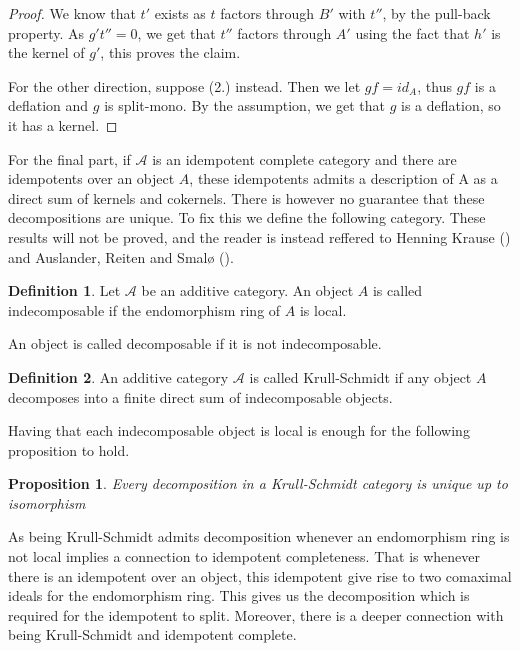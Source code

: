 \documentclass[11pt]{article}
\newtheorem{prop}[theorem]{Proposition}
\theoremstyle{definition}
\newtheorem{definition}{Definition}[section]
\theoremstyle{remark}
\begin{document}
\begin{proof}
                We know that $t'$ exists as $t$ factors through $B'$ with $t''$, by the pull-back property. As $g't''=0$, we get that $t''$ factors through $A'$ using the fact that $h'$ is the kernel of $g'$, this proves the claim.
                
                For the other direction, suppose (2.) instead. Then we let $gf=id_A$, thus $gf$ is a deflation and $g$ is split-mono. By the assumption, we get that $g$ is a deflation, so it has a kernel.
            \end{proof}

            For the final part, if $\mathcal{A}$ is an idempotent complete category and there are idempotents over an object $A$, these idempotents admits a description of A as a direct sum of kernels and cokernels. There is however no guarantee that these decompositions are unique. To fix this we define the following category. These results will not be proved, and the reader is instead reffered to Henning Krause (\cite{Kra12}) and Auslander, Reiten and Smalø (\cite{Rei95}).

            \begin{definition}
                Let $\mathcal{A}$ be an additive category. An object $A$ is called indecomposable if the endomorphism ring of $A$ is local.

                An object is called decomposable if it is not indecomposable.
            \end{definition}

            \begin{definition}
                An additive category $\mathcal{A}$ is called Krull-Schmidt if any object $A$ decomposes into a finite direct sum of indecomposable objects.
            \end{definition}

            Having that each indecomposable object is local is enough for the following proposition to hold.

            \begin{prop}
                Every decomposition in a Krull-Schmidt category is unique up to isomorphism
            \end{prop}

            As being Krull-Schmidt admits decomposition whenever an endomorphism ring is not local implies a connection to idempotent completeness. That is whenever there is an idempotent over an object, this idempotent give rise to two comaximal ideals for the endomorphism ring. This gives us the decomposition which is required for the idempotent to split. Moreover, there is a deeper connection with being Krull-Schmidt and idempotent complete.
\end{document}
